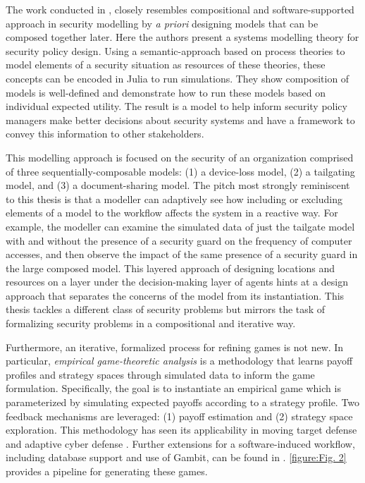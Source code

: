 The work conducted in \cite{Caulfield2015}, \cite{Caulfield2014} closely resembles compositional and software-supported approach in security modelling by \textit{a priori} designing models that can be composed together later. Here the authors present a systems modelling theory for security policy design. Using a semantic-approach based on process theories to model elements of a security situation as resources of these theories, these concepts can be encoded in Julia to run simulations. They show composition of models is well-defined and demonstrate how to run these models based on individual expected utility. The result is a model to help inform security policy managers make better decisions about security systems and have a framework to convey this information to other stakeholders.  

This modelling approach is focused on the security of an organization comprised of three sequentially-composable models: (1) a device-loss model, (2) a tailgating model, and (3) a document-sharing model. The pitch most strongly reminiscent to this thesis is that a modeller can adaptively see how including or excluding elements of a model to the workflow affects the system in a reactive way. For example, the modeller can examine the simulated data of just the tailgate model with and without the presence of a security guard on the frequency of computer accesses, and then observe the impact of the same presence of a security guard in the large composed model. This layered approach of designing locations and resources on a layer under the decision-making layer of agents hints at a design approach that separates the concerns of the model from its instantiation. This thesis tackles a different class of security problems but mirrors the task of formalizing security problems in a compositional and iterative way.

Furthermore, an iterative, formalized process for refining games is not new. In particular, \textit{empirical game-theoretic analysis} is a methodology that learns payoff profiles and strategy spaces through simulated data to inform the game formulation. Specifically, the goal is to instantiate an empirical game which is parameterized by simulating expected payoffs according to a strategy profile. Two feedback mechanisms are leveraged: (1) payoff estimation and (2) strategy space exploration.  This methodology has seen its applicability in moving target defense \cite{Wellman2015} and adaptive cyber defense \cite{Wellman2019}. Further extensions for a software-induced workflow, including database support and use of Gambit, can be found in \cite{EGTAOnline}. \ref{figure:Fig. 2} provides a pipeline for generating these games. 

